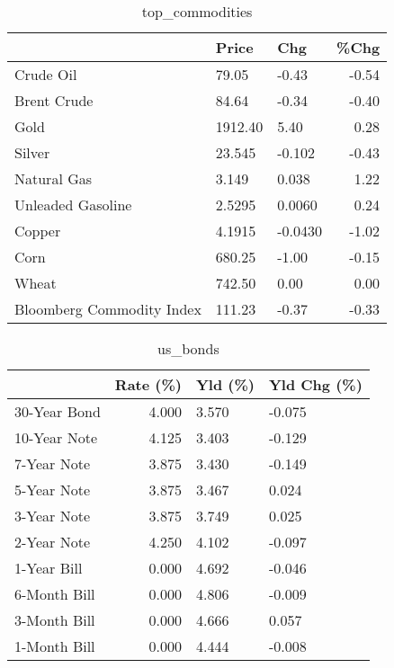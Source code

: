 \documentclass{article}%
\begin{document}
\begin{table}[htbp]%
\caption{top\_commodities}%
\centering%
\begin{adjustbox}{width=1\textwidth}%
\begin{tabular}{lllr}
\toprule
                          &   Price &     Chg &  \%Chg \\
\midrule
               Crude Oil  &   79.05 &   -0.43 & -0.54 \\
             Brent Crude  &   84.64 &   -0.34 & -0.40 \\
                    Gold  & 1912.40 &    5.40 &  0.28 \\
                  Silver  &  23.545 &  -0.102 & -0.43 \\
             Natural Gas  &   3.149 &   0.038 &  1.22 \\
       Unleaded Gasoline  &  2.5295 &  0.0060 &  0.24 \\
                  Copper  &  4.1915 & -0.0430 & -1.02 \\
                    Corn  &  680.25 &   -1.00 & -0.15 \\
                   Wheat  &  742.50 &    0.00 &  0.00 \\
Bloomberg Commodity Index &  111.23 &   -0.37 & -0.33 \\
\bottomrule
\end{tabular}
%
\end{adjustbox}%
\end{table}

%


\begin{table}[htbp]%
\caption{us\_bonds}%
\centering%
\begin{adjustbox}{width=1\textwidth}%
\begin{tabular}{lrll}
\toprule
             &  Rate (\%) & Yld (\%) & Yld Chg (\%) \\
\midrule
30-Year Bond &     4.000 &   3.570 &      -0.075 \\
10-Year Note &     4.125 &   3.403 &      -0.129 \\
 7-Year Note &     3.875 &   3.430 &      -0.149 \\
 5-Year Note &     3.875 &   3.467 &       0.024 \\
 3-Year Note &     3.875 &   3.749 &       0.025 \\
 2-Year Note &     4.250 &   4.102 &      -0.097 \\
 1-Year Bill &     0.000 &   4.692 &      -0.046 \\
6-Month Bill &     0.000 &   4.806 &      -0.009 \\
3-Month Bill &     0.000 &   4.666 &       0.057 \\
1-Month Bill &     0.000 &   4.444 &      -0.008 \\
\bottomrule
\end{tabular}
%
\end{adjustbox}%
\end{table}
\end{document}
